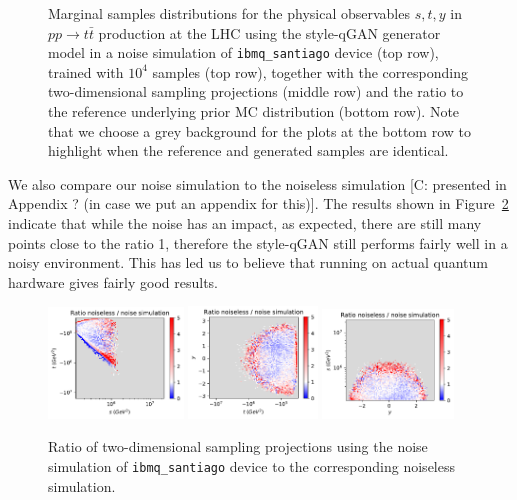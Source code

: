 \documentclass[twocolumn,preprintnumbers,superscriptaddress]{revtex4-2}
\newcommand{\commentCBP}[1]{{\color{red} {[C: #1]}}}
\begin{document}
\begin{figure}
  \caption{\label{fig:ibmnoise}
    Marginal samples distributions for the physical observables $s,t,y$
    in $pp\rightarrow t\bar{t}$ production at the LHC using the style-qGAN generator model in
    a noise simulation of {\tt ibmq\_santiago} device (top row), trained with $10^4$ samples (top row),
    together with the corresponding two-dimensional sampling projections (middle row) and the ratio to the reference underlying
    prior MC distribution (bottom row). Note that we choose a grey background for the plots at the bottom
    row to highlight when the reference and generated samples are identical.}
\end{figure}

We also compare our noise simulation to the noiseless simulation \commentCBP{ presented in Appendix ? (in case we put an appendix for this)}.
The results shown in Figure~\ref{fig:ibmnoise2} indicate that while the noise has an impact, as expected, there are
still many points close to the ratio 1, therefore the style-qGAN still performs fairly well in a noisy environment. This has led us
to believe that running on actual quantum hardware gives fairly good results.

\begin{figure}

  \includegraphics[width=0.32\textwidth]{plots/hardware_noise_simulation/s-t_RATIO_100k_noiseless-noise.pdf}%
  \includegraphics[width=0.305\textwidth]{plots/hardware_noise_simulation/t-y_RATIO_100k_noiseless-noise.pdf}%
  \includegraphics[width=0.31\textwidth]{plots/hardware_noise_simulation/y-s_RATIO_100k_noiseless-noise.pdf}

  \caption{\label{fig:ibmnoise2}Ratio of two-dimensional sampling projections using the noise simulation of {\tt ibmq\_santiago} device to the
    corresponding noiseless simulation.}
\end{figure}

\end{document}
